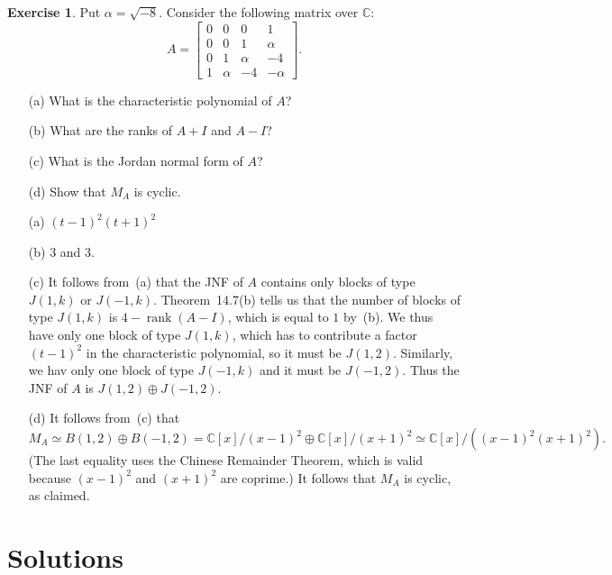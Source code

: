 \documentclass{amsart}
\newcommand{\bbm}       {\left[\begin{matrix}}
\newcommand{\ebm}       {\end{matrix}\right]}
\newcommand{\rank}      {\operatorname{rank}}
\newcommand{\C}         {{\mathbb{C}}}
\newcommand{\al}        {\alpha}
\newcommand{\ip}[1]     {\langle #1\rangle}
\newcommand{\op}        {\oplus}
\renewcommand{\:}{\colon}
\theoremstyle{definition}
\newtheorem{exercise}{Exercise}[section]
\renewenvironment{solution}{\SolutionAtEnd}{\endSolutionAtEnd}
\begin{document}
\begin{exercise}
 Put $\al=\sqrt{-8}$.  Consider the following matrix over $\C$: 
 \[ A = \bbm 0&0&0&1 \\ 0&0&1&\al \\ 0&1&\al&-4 \\ 1&\al&-4&-\al\ebm.
 \]
 \begin{itemize}
  \item[(a)] What is the characteristic polynomial of $A$?
  \item[(b)] What are the ranks of $A+I$ and $A-I$?
  \item[(c)] What is the Jordan normal form of $A$?
  \item[(d)] Show that $M_A$ is cyclic.
 \end{itemize}
\end{exercise}
\begin{solution}
 \begin{itemize}
  \item[(a)] $(t-1)^2(t+1)^2$
  \item[(b)] $3$ and $3$.
  \item[(c)] It follows from~(a) that the JNF of $A$ contains only
   blocks of type $J(1,k)$ or $J(-1,k)$.  Theorem~14.7(b) tells us
   that the number of blocks of type $J(1,k)$ is $4-\rank(A-I)$, which
   is equal to $1$ by~(b).  We thus have only one block of type
   $J(1,k)$, which has to contribute a factor $(t-1)^2$ in the
   characteristic polynomial, so it must be $J(1,2)$.  Similarly, we
   hav only one block of type $J(-1,k)$ and it must be $J(-1,2)$.
   Thus the JNF of $A$ is $J(1,2)\op J(-1,2)$.

  \item[(d)] It follows from~(c) that 
   \[ M_A\simeq B(1,2)\op B(-1,2) =
       \C[x]/(x-1)^2\op\C[x]/(x+1)^2\simeq \C[x]/((x-1)^2(x+1)^2).
   \]
   (The last equality uses the Chinese Remainder Theorem, which is
   valid because $(x-1)^2$ and $(x+1)^2$ are coprime.)  It follows
   that $M_A$ is cyclic, as claimed.
 \end{itemize}
\end{solution}


\newpage

\section*{Solutions}
\label{apx-solutions}

\end{document}
